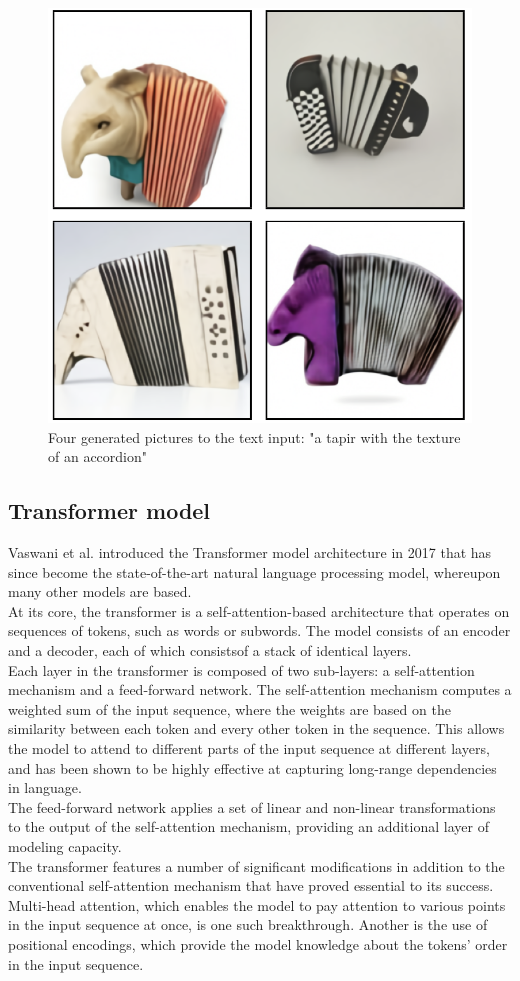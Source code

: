 \documentclass[9pt,twocolumn,twoside]{osajnl}
\begin{document}
\begin{figure}[htbp]
	\centering
	\includegraphics[width=.7\linewidth]{images/DallEExampleTapir.png}
	\caption{Four generated pictures to the text input: "a tapir with the texture of an accordion" \cite{zeroShot}}
	\label{exampleTapir}
\end{figure}

\subsection{Transformer model}
Vaswani et al. introduced the Transformer model architecture in 2017 \cite{transformer} that has since become the state-of-the-art natural language processing model, whereupon many other models are based.\\
At its core, the transformer is a self-attention-based architecture that operates on sequences of tokens, such as words or subwords. The model consists of an encoder and a decoder, each of which consistsof a stack of identical layers.\\
Each layer in the transformer is composed of two sub-layers: a self-attention mechanism and a feed-forward network. The self-attention mechanism computes a weighted sum of the input sequence, where the weights are based on the similarity between each token and every other token in the sequence. This allows the model to attend to different parts of the input sequence at different layers, and has been shown to be highly effective at capturing long-range dependencies in language.\\
The feed-forward network applies a set of linear and non-linear transformations to the output of the self-attention mechanism, providing an additional layer of modeling capacity. \\
The transformer features a number of significant modifications in addition to the conventional self-attention mechanism that have proved essential to its success. Multi-head attention, which enables the model to pay attention to various points in the input sequence at once, is one such breakthrough. Another is the use of positional encodings, which provide the model knowledge about the tokens' order in the input sequence.
\end{document}
